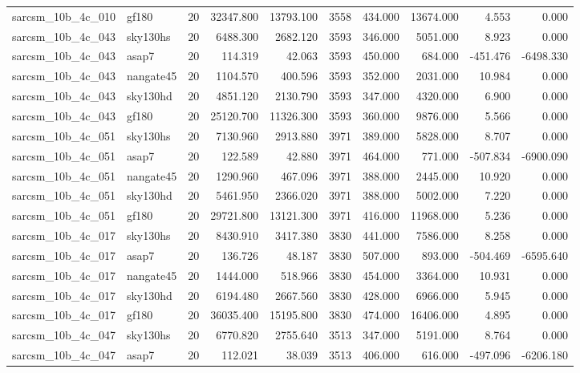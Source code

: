 \begin{longtable}{llrrrrrrrr}
sarcsm\_10b\_4c\_010 & gf180 & 20 & 32347.800 & 13793.100 & 3558 & 434.000 & 13674.000 & 4.553 & 0.000 \\
sarcsm\_10b\_4c\_043 & sky130hs & 20 & 6488.300 & 2682.120 & 3593 & 346.000 & 5051.000 & 8.923 & 0.000 \\
sarcsm\_10b\_4c\_043 & asap7 & 20 & 114.319 & 42.063 & 3593 & 450.000 & 684.000 & -451.476 & -6498.330 \\
sarcsm\_10b\_4c\_043 & nangate45 & 20 & 1104.570 & 400.596 & 3593 & 352.000 & 2031.000 & 10.984 & 0.000 \\
sarcsm\_10b\_4c\_043 & sky130hd & 20 & 4851.120 & 2130.790 & 3593 & 347.000 & 4320.000 & 6.900 & 0.000 \\
sarcsm\_10b\_4c\_043 & gf180 & 20 & 25120.700 & 11326.300 & 3593 & 360.000 & 9876.000 & 5.566 & 0.000 \\
sarcsm\_10b\_4c\_051 & sky130hs & 20 & 7130.960 & 2913.880 & 3971 & 389.000 & 5828.000 & 8.707 & 0.000 \\
sarcsm\_10b\_4c\_051 & asap7 & 20 & 122.589 & 42.880 & 3971 & 464.000 & 771.000 & -507.834 & -6900.090 \\
sarcsm\_10b\_4c\_051 & nangate45 & 20 & 1290.960 & 467.096 & 3971 & 388.000 & 2445.000 & 10.920 & 0.000 \\
sarcsm\_10b\_4c\_051 & sky130hd & 20 & 5461.950 & 2366.020 & 3971 & 388.000 & 5002.000 & 7.220 & 0.000 \\
sarcsm\_10b\_4c\_051 & gf180 & 20 & 29721.800 & 13121.300 & 3971 & 416.000 & 11968.000 & 5.236 & 0.000 \\
sarcsm\_10b\_4c\_017 & sky130hs & 20 & 8430.910 & 3417.380 & 3830 & 441.000 & 7586.000 & 8.258 & 0.000 \\
sarcsm\_10b\_4c\_017 & asap7 & 20 & 136.726 & 48.187 & 3830 & 507.000 & 893.000 & -504.469 & -6595.640 \\
sarcsm\_10b\_4c\_017 & nangate45 & 20 & 1444.000 & 518.966 & 3830 & 454.000 & 3364.000 & 10.931 & 0.000 \\
sarcsm\_10b\_4c\_017 & sky130hd & 20 & 6194.480 & 2667.560 & 3830 & 428.000 & 6966.000 & 5.945 & 0.000 \\
sarcsm\_10b\_4c\_017 & gf180 & 20 & 36035.400 & 15195.800 & 3830 & 474.000 & 16406.000 & 4.895 & 0.000 \\
sarcsm\_10b\_4c\_047 & sky130hs & 20 & 6770.820 & 2755.640 & 3513 & 347.000 & 5191.000 & 8.764 & 0.000 \\
sarcsm\_10b\_4c\_047 & asap7 & 20 & 112.021 & 38.039 & 3513 & 406.000 & 616.000 & -497.096 & -6206.180 \\

\end{longtable}
